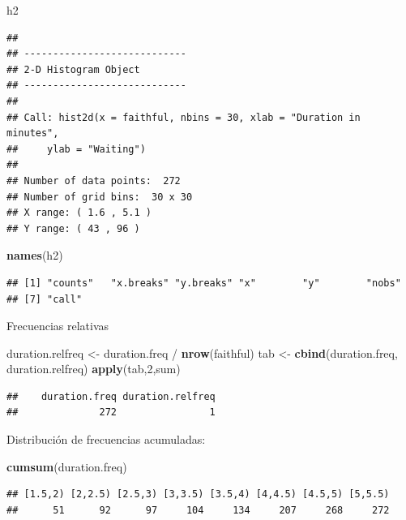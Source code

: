 \documentclass[]{article}
\newenvironment{Shaded}{\begin{snugshade}}{\end{snugshade}}
\newcommand{\KeywordTok}[1]{\textcolor[rgb]{0.13,0.29,0.53}{\textbf{{#1}}}}
\newcommand{\DecValTok}[1]{\textcolor[rgb]{0.00,0.00,0.81}{{#1}}}
\newcommand{\StringTok}[1]{\textcolor[rgb]{0.31,0.60,0.02}{{#1}}}
\newcommand{\NormalTok}[1]{{#1}}
\numberwithin{equation}{section}
\begin{document}
\begin{Shaded}
\begin{Highlighting}[]
\NormalTok{h2}
\end{Highlighting}
\end{Shaded}

\begin{verbatim}
## 
## ----------------------------
## 2-D Histogram Object
## ----------------------------
## 
## Call: hist2d(x = faithful, nbins = 30, xlab = "Duration in minutes", 
##     ylab = "Waiting")
## 
## Number of data points:  272 
## Number of grid bins:  30 x 30 
## X range: ( 1.6 , 5.1 )
## Y range: ( 43 , 96 )
\end{verbatim}

\begin{Shaded}
\begin{Highlighting}[]
\KeywordTok{names}\NormalTok{(h2)}
\end{Highlighting}
\end{Shaded}

\begin{verbatim}
## [1] "counts"   "x.breaks" "y.breaks" "x"        "y"        "nobs"    
## [7] "call"
\end{verbatim}

Frecuencias relativas

\begin{Shaded}
\begin{Highlighting}[]
\NormalTok{duration.relfreq <-}\StringTok{ }\NormalTok{duration.freq /}\StringTok{ }\KeywordTok{nrow}\NormalTok{(faithful) }
\NormalTok{tab <-}\StringTok{ }\KeywordTok{cbind}\NormalTok{(duration.freq, duration.relfreq) }
\KeywordTok{apply}\NormalTok{(tab,}\DecValTok{2}\NormalTok{,sum)}
\end{Highlighting}
\end{Shaded}

\begin{verbatim}
##    duration.freq duration.relfreq 
##              272                1
\end{verbatim}

Distribución de frecuencias acumuladas:

\begin{Shaded}
\begin{Highlighting}[]
\KeywordTok{cumsum}\NormalTok{(duration.freq)}
\end{Highlighting}
\end{Shaded}

\begin{verbatim}
## [1.5,2) [2,2.5) [2.5,3) [3,3.5) [3.5,4) [4,4.5) [4.5,5) [5,5.5) 
##      51      92      97     104     134     207     268     272
\end{verbatim}
\end{document}

